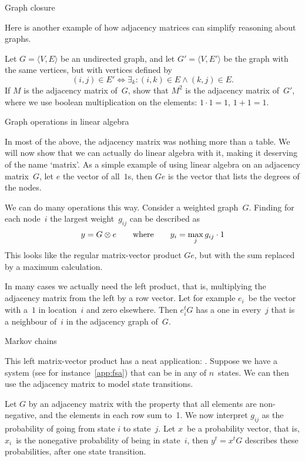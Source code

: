  {Graph closure}
\label{app:graph-closure}

Here is another example of how adjacency matrices can simplify
reasoning about graphs.
\begin{exercise}
  Let $G=\langle V,E\rangle$ be an undirected graph, and let $G'=\langle
  V,E'\rangle$ be the graph with the same vertices, but with vertices
  defined by
  \[ (i,j)\in E'\Leftrightarrow \exists_k\colon (i,k)\in E\wedge
  (k,j)\in E. \]
  If $M$ is the adjacency matrix of~$G$, show that $M^2$ is the
  adjacency matrix of~$G'$, where we use boolean multiplication on the
  elements: $1\cdot1=1$, $1+1=1$.
\end{exercise}

 {Graph operations in linear algebra}
\label{app:graph-mult}

In most of the above, the adjacency matrix was nothing more than a table.
We will now show that we can actually do linear algebra with it,
making it deserving of the name `matrix'. As a simple example
of using linear algebra on an adjacency matrix~$G$,
let $e$ the vector of all~$1$s, then $Ge$ is 
the vector that lists the degrees of the nodes.

We can do many operations this way. Consider a weighted graph~$G$.
Finding for each node~$i$ the largest weight~$g_{ij}$ can be described as
\[ y=G\otimes e\qquad\hbox{where}\qquad
   y_i=\max_j g_{ij}\cdot 1
\]
This looks like the regular matrix-vector product $Ge$, but with
the sum replaced by a maximum calculation.

In many cases we actually need the left product, that is, multiplying
the adjacency matrix from the left by a row vector. Let for example $e_i$~be 
the vector with a~$1$ in location~$i$ and zero elsewhere. Then $e_i^tG$
has a one in every~$j$ that is a neighbour of~$i$ in the adjacency graph of~$G$.

 {Markov chains}

This left matrix-vector product has a neat application: .
Suppose we have a system (see for instance~\ref{app:fsa}) that can be
in any of $n$~states. We can then use the adjacency matrix to model
state transitions.

Let $G$ by an adjacency matrix with the property that all elements are
non-negative, and the elements in each row sum to~1. We now interpret
$g_{ij}$ as the probability of going from state $i$ to state~$j$. Let
$x$~be a probability vector, that is, $x_i$~is the nonegative probability 
of being in state~$i$, then $y^t=x^tG$ describes these probabilities,
after one state transition.

